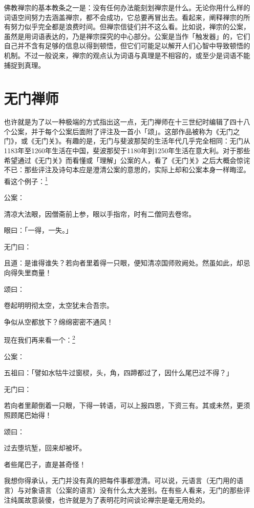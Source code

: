 \documentclass[
  12pt,
  twoside,
  openright,
  oldfontcommands,
]{memoir}
\begin{document}
佛教禅宗的基本教条之一是：没有任何办法能刻划禅宗是什么。无论你用什么样的词语空间努力去涵盖禅宗，都不会成功，它总要再冒出去。看起来，阐释禅宗的所有努力似乎完全都是浪费时间。但禅宗信徒们并不这么看。比如说，禅宗的公案，虽然是用词语表达的，乃是禅宗探究的中心部分。公案是当作「触发器」的，它们自己并不含有足够的信息以得到顿悟，但它们可能足以解开人们心智中导致顿悟的机制。不过一般说来，禅宗的观点认为词语与真理是不相容的，或至少是词语不能捕捉到真理。

\section{无门禅师}

也许就是为了以一种极端的方式指出这一点，无门禅师在十三世纪时编辑了四十八个公案，并于每个公案后面附了评注及一首小「颂」。这部作品被称为《无门之门》，或《无门关》。有趣的是，无门与斐波那契的生活年代几乎完全相同：无门从1183年至1260年生活在中国，斐波那契于1180年到1250年生活在意大利。对于那些希望通过《无门关》而看懂或「理解」公案的人，看了《无门关》之后大概会惊诧不已：那些评注及诗句本应是澄清公案的意思的，实际上却和公案本身一样晦涩。看这个例子：\hyperref[fn:Chapter09-1]{\textsuperscript{1}}

公案：

清凉大法眼，因僧斋前上参，眼以手指帘，时有二僧同去卷帘。

眼曰：「一得，一失。」

无门曰：

且道：是谁得谁失？若向者里着得一只眼，便知清凉国师败阙处。然虽如此，却忌向得失里商量！

颂曰：

卷起明明彻太空，太空犹未合吾宗。

争似从空都放下？绵绵密密不通风！

现在我们再来看一个：\hyperref[fn:Chapter09-2]{\textsuperscript{2}}

公案：

五祖曰：「譬如水牯牛过窗棂，头，角，四蹄都过了，因什么尾巴过不得？」

无门曰：

若向者里颠倒着一只眼，下得一转语，可以上报四恩，下资三有。其或未然，更须照顾尾巴始得！

颂曰：

过去堕坑堑，回来却被坏。

者些尾巴子，直是甚奇怪！

我想你得承认，无门并没有真的把每件事都澄清。可以说，元语言（无门用的语言）与对象语言（公案的语言）没有什么太大差别。在有些人看来，无门的那些评注纯属故意装傻，也许就是为了表明花时间谈论禅宗是毫无用处的。
\end{document}
